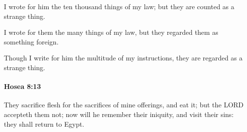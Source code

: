 			\begin{versebox}
					\item[BHS] 
					\item[LXX] 
					\item[ASV] I wrote for him the ten thousand things of my law; but they are counted as a strange thing.
					\item[NIV] I wrote for them the many things of my law, but they regarded them as something foreign.
					\item[NRSV] Though I write for him the multitude of my instructions, they are regarded as a strange thing.
			\end{versebox}

		\paragraph{Hosea 8:13} %
			\label{HOSEA-8-13}

			They sacrifice flesh for the sacrifices of mine offerings, and eat it; but the LORD accepteth them not; now will he remember their iniquity, and visit their sins: they shall return to Egypt.

